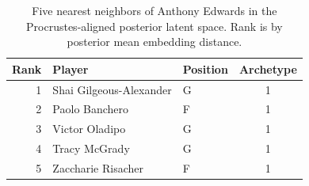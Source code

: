 \begin{table}[htbp]
  \centering\small
  \begin{tabular}{rllc}
    \toprule
    Rank & Player & Position & Archetype \\
    \midrule
    1 & Shai Gilgeous-Alexander & G & 1 \\
    2 & Paolo Banchero & F & 1 \\
    3 & Victor Oladipo & G & 1 \\
    4 & Tracy McGrady & G & 1 \\
    5 & Zaccharie Risacher & F & 1 \\
    \bottomrule
  \end{tabular}
  \caption{Five nearest neighbors of Anthony Edwards in the Procrustes-aligned posterior latent space. Rank is by posterior mean embedding distance.}
  \label{tab:Anthony_Edwards_neighbors}
\end{table}

